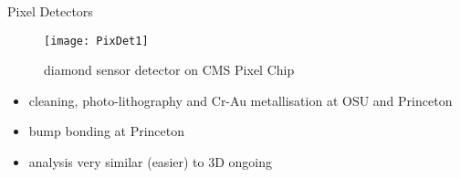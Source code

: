 \begin{frame}{Pixel Detectors}

	\begin{figure}[h] 
		\centering
		\texttt{[image: PixDet1]}
		\caption{diamond sensor detector on CMS Pixel Chip} 	
	\end{figure}
	
	\begin{itemize}
		\itemfill
		\item cleaning, photo-lithography and Cr-Au metallisation at OSU and Princeton
		\item bump bonding at Princeton
		\item analysis very similar (easier) to 3D \ra ongoing
	\end{itemize}
	
\end{frame}
